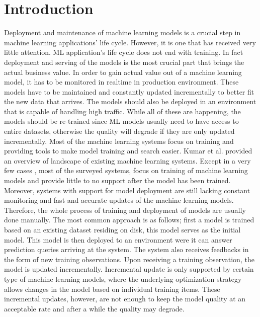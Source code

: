 \documentclass{sig-alternate-05-2015}
\begin{document}
\section{Introduction} \label{introduction}
Deployment and maintenance of machine learning models is a crucial step in machine learning applications' life cycle. 
However, it is one that has received very little attention. 
ML application's life cycle does not end with training. 
In fact deployment and serving of the models is the most crucial part that brings the actual business value. 
In order to gain actual value out of a machine learning model, it has to be monitored in realtime in production environment. 
These models have to be maintained and constantly updated incrementally to better fit the new data that arrives. 
The models should also be deployed in an environment that is capable of handling high traffic. 
While all of these are happening, the models should be re-trained since ML models usually need to have access to entire datasets, otherwise the quality will degrade if they are only updated incrementally.
Most of the machine learning systems focus on training and providing tools to make model training and search easier. 
Kumar et al. \cite{kumar2015survey} provided an overview of landscape of existing machine learning systems. 
Except in a very few cases \cite{akdere2011case, crankshaw2014missing}, most of the surveyed systems, focus on training of machine learning models and provide little to no support after the model has been trained.
Moreover, systems with support for model deployment are still lacking constant monitoring and fast and accurate updates of the machine learning models.
Therefore, the whole process of training and deployment of models are usually done manually.
The most common approach is as follows; first a model is trained based on an existing dataset residing on disk, this model serves as the initial model.
This model is then deployed to an environment were it can answer prediction queries arriving at the system.
The system also receives feedbacks in the form of new training observations.
Upon receiving a training observation, the model is updated incrementally.
Incremental update is only supported by certain type of machine learning models, where the underlying optimization strategy allows changes in the model based on individual training items.
These incremental updates, however, are not enough to keep the model quality at an acceptable rate and after a while the quality may degrade.
\end{document}
